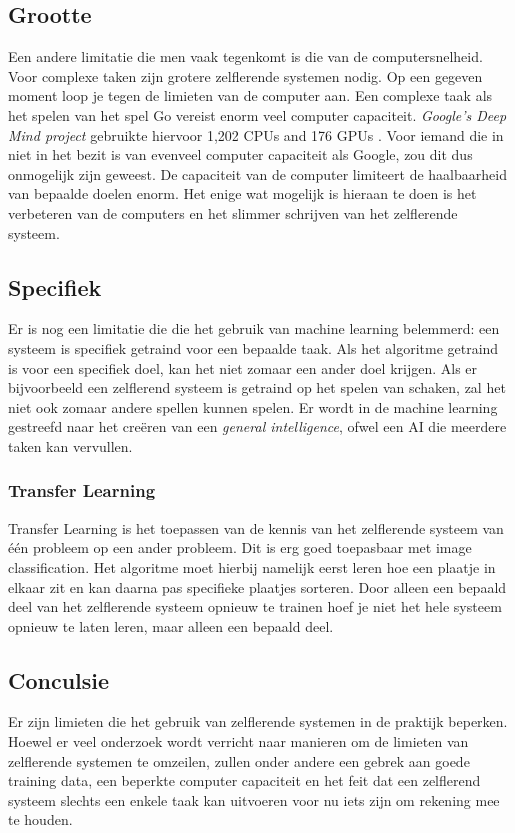 \subsection{Grootte}
Een andere limitatie die men vaak tegenkomt is die van de computersnelheid. Voor complexe taken zijn grotere zelflerende systemen nodig. Op een gegeven moment loop je tegen de limieten van de computer aan. Een complexe taak als het spelen van het spel Go vereist enorm veel computer capaciteit. \textit{Google’s Deep Mind project} gebruikte hiervoor 1,202 CPUs and 176 GPUs \cite{GoogleDeepMindArticle}.  Voor iemand die in niet in het bezit is van evenveel computer capaciteit als Google, zou dit dus onmogelijk zijn geweest. De capaciteit van de computer limiteert de haalbaarheid van bepaalde doelen enorm. Het enige wat mogelijk is hieraan te doen is het verbeteren van de computers en het slimmer schrijven van het zelflerende systeem.

\subsection{Specifiek}
Er is nog een limitatie die die het gebruik van machine learning belemmerd: een systeem is specifiek getraind voor een bepaalde taak.  Als het algoritme getraind is voor een specifiek doel, kan het niet zomaar een ander doel krijgen. Als er bijvoorbeeld een zelflerend systeem is getraind op het spelen van schaken, zal het niet ook zomaar andere spellen kunnen spelen. Er wordt in de machine learning gestreefd naar het creëren van een \textit{general intelligence}, ofwel een AI die meerdere taken kan vervullen. 

\subsubsection{Transfer Learning}
Transfer Learning is het toepassen van de kennis van het zelflerende systeem van \'{e}\'{e}n probleem op een ander probleem. Dit is erg goed toepasbaar met image classification. Het algoritme moet hierbij namelijk eerst leren hoe een plaatje in elkaar zit en kan daarna pas specifieke plaatjes sorteren. Door alleen een bepaald deel van het zelflerende systeem opnieuw te trainen hoef je niet het hele systeem opnieuw te laten leren, maar alleen een bepaald deel. 

\subsection{Conculsie}
Er zijn limieten die het gebruik van zelflerende systemen in de praktijk beperken. Hoewel er veel onderzoek wordt verricht naar manieren om de limieten van zelflerende systemen te omzeilen, zullen onder andere een gebrek aan goede training data, een beperkte computer capaciteit en het feit dat een zelflerend systeem slechts een enkele taak kan uitvoeren voor nu iets zijn om rekening mee te houden.
